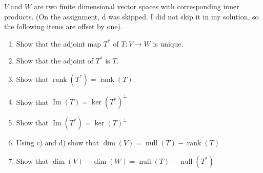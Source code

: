 \documentclass[11pt]{article}
\theoremstyle{definition}
\newenvironment{customex}[1]
  {\renewcommand\theinnercustomex{#1}\innercustomex}
  {\endinnercustomex}
\DeclareMathOperator{\nul}{null}
\DeclareMathOperator{\rank}{rank}
\DeclareMathOperator{\im}{Im}
\begin{document}
    \begin{customex}{\textbf{2}}
        $V$ and $W$ are two finite dimensional vector spaces with corresponding inner products. (On the assignment, d was skipped. I did not skip it in my solution, so the following items are offset by one).
        
        \begin{enumerate}[label = \alph*)]
            \item Show that the adjoint map $T^*$ of $T: V \to W$ is unique.
            \item Show that the adjoint of $T^*$ is $T$.
            \item Show that $\rank(T^*) = \rank(T)$.
            \item Show that $\im(T) = \ker(T^*)^{\perp}$
            \item Show that $\im(T^*) = \ker(T)^{\perp}$
            \item Using c) and d) show that $\dim(V) = \nul(T) - \rank(T)$
            \item Show that $\dim(V) - \dim(W) = \nul(T) - \nul(T^*)$
        \end{enumerate}
    \end{customex}
\end{document}
